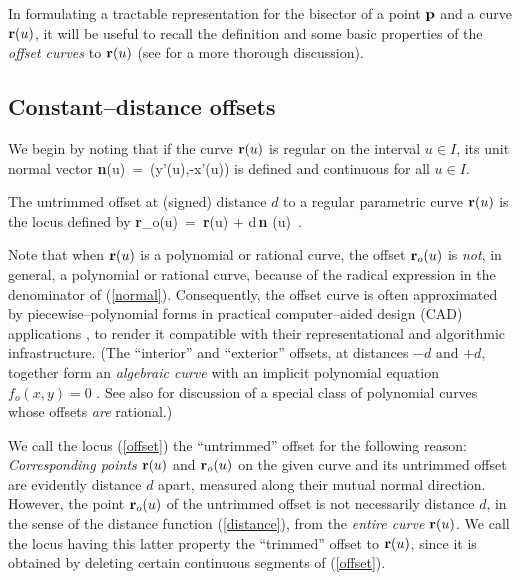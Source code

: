In formulating a tractable representation for the bisector of a
point ${\bf p}$ and a curve ${\bf r}(u)$, it will be useful to recall
the definition and some basic properties of the {\it offset curves\/}
to ${\bf r}(u)$ (see \cite{farouki90a,farouki90b} for a more thorough
discussion).

\subsection{Constant--distance offsets}

We begin by noting that if the curve ${\bf r}(u)$ is regular on the
interval $u \in I$, its unit normal vector
\be \label{normal}
{\bf n}(u) \,=\, {(y'(u),-x'(u)) \over {}}
\ee
is defined and continuous for all $u \in I$.

\begin{dfn}
The untrimmed offset at (signed) distance $d$ to a regular parametric
curve ${\bf r}(u)$ is the locus defined by
\be \label{offset}
{\bf r}_o(u) \,=\, {\bf r}(u) + d\,{\bf n} (u) \,.
\ee
\end{dfn}

Note that when ${\bf r}(u)$ is a polynomial or rational curve,
the offset ${\bf r}_o(u)$ is {\it not}, in general, a polynomial
or rational curve, because of the radical expression in the
denominator of (\ref{normal}). Consequently, the offset curve
is often approximated by piecewise--polynomial forms
in practical computer--aided
design (CAD) applications
\cite
{hoschek88,klass83,pham88,tiller84},
to render it compatible with their
representational and algorithmic infrastructure. (The ``interior''
and ``exterior'' offsets, at distances $-d$ and $+d$, together form
an {\it algebraic curve\/} with an implicit polynomial equation
$f_o(x,y)=0$ \cite{farouki90b}. See also \cite{farouki90c,farouki91a}
for discussion of a special class of polynomial curves whose offsets
{\it are\/} rational.)

We call the locus (\ref{offset}) the ``untrimmed'' offset for the
following reason: {\it Corresponding points\/} ${\bf r}(u)$ and
${\bf r}_o(u)$ on the given curve and its untrimmed offset are
evidently distance $d$ apart, measured along their mutual normal
direction. However, the point ${\bf r}_o(u)$ of the untrimmed offset
is not necessarily distance $d$, in the sense of the distance function
(\ref{distance}), from the {\it entire curve\/} ${\bf r}(u)$. We call
the locus having this latter property the ``trimmed'' offset to
${\bf r}(u)$, since it is obtained by deleting certain continuous
segments of (\ref{offset}).

